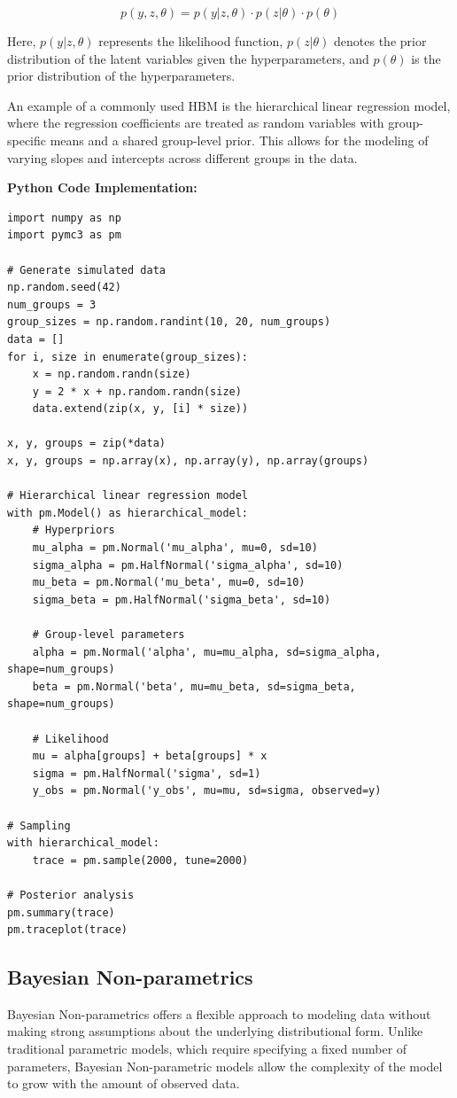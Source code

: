 \documentclass[12pt]{book} %
\begin{document}
\[ p(y, z, \theta) = p(y | z, \theta) \cdot p(z | \theta) \cdot p(\theta) \]

Here, $ p(y | z, \theta) $ represents the likelihood function, $ p(z | \theta) $ denotes the prior distribution of the latent variables given the hyperparameters, and $ p(\theta) $ is the prior distribution of the hyperparameters.

An example of a commonly used HBM is the hierarchical linear regression model, where the regression coefficients are treated as random variables with group-specific means and a shared group-level prior. This allows for the modeling of varying slopes and intercepts across different groups in the data.

\textbf{Python Code Implementation:}
\FloatBarrier
\begin{lstlisting}
import numpy as np
import pymc3 as pm

# Generate simulated data
np.random.seed(42)
num_groups = 3
group_sizes = np.random.randint(10, 20, num_groups)
data = []
for i, size in enumerate(group_sizes):
    x = np.random.randn(size)
    y = 2 * x + np.random.randn(size)
    data.extend(zip(x, y, [i] * size))

x, y, groups = zip(*data)
x, y, groups = np.array(x), np.array(y), np.array(groups)

# Hierarchical linear regression model
with pm.Model() as hierarchical_model:
    # Hyperpriors
    mu_alpha = pm.Normal('mu_alpha', mu=0, sd=10)
    sigma_alpha = pm.HalfNormal('sigma_alpha', sd=10)
    mu_beta = pm.Normal('mu_beta', mu=0, sd=10)
    sigma_beta = pm.HalfNormal('sigma_beta', sd=10)

    # Group-level parameters
    alpha = pm.Normal('alpha', mu=mu_alpha, sd=sigma_alpha, shape=num_groups)
    beta = pm.Normal('beta', mu=mu_beta, sd=sigma_beta, shape=num_groups)

    # Likelihood
    mu = alpha[groups] + beta[groups] * x
    sigma = pm.HalfNormal('sigma', sd=1)
    y_obs = pm.Normal('y_obs', mu=mu, sd=sigma, observed=y)

# Sampling
with hierarchical_model:
    trace = pm.sample(2000, tune=2000)

# Posterior analysis
pm.summary(trace)
pm.traceplot(trace)
\end{lstlisting}

\subsection{Bayesian Non-parametrics}
Bayesian Non-parametrics offers a flexible approach to modeling data without making strong assumptions about the underlying distributional form. Unlike traditional parametric models, which require specifying a fixed number of parameters, Bayesian Non-parametric models allow the complexity of the model to grow with the amount of observed data.
\end{document}
